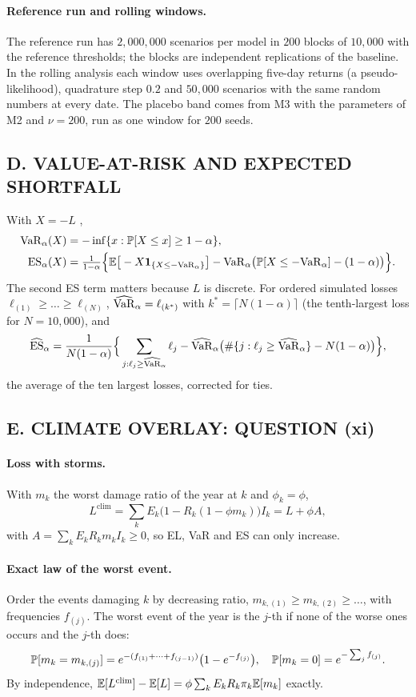 \paragraph{Reference run and rolling windows.} The reference run has $2{,}000{,}000$ scenarios per model in $200$ blocks of $10{,}000$ with the reference thresholds; the blocks are independent replications of the baseline. In the rolling analysis each window uses overlapping five-day returns (a pseudo-likelihood), quadrature step $0.2$ and $50{,}000$ scenarios with the same random numbers at every date. The placebo band comes from M3 with the parameters of M2 and $\nu=200$, run as one window for $200$ seeds.

\subsection*{D. VALUE-AT-RISK AND EXPECTED SHORTFALL}
With $X=-L$ \citep[Ch.~1]{DeGiorgi26},
\begin{align*}
\VaR_\alpha(X)&=-\inf\{x:\P[X\le x]\ge1-\alpha\},\\
\ES_\alpha(X)&=\tfrac{1}{1-\alpha}\Big\{\E\big[-X\ind_{\{X\le-\VaR_\alpha\}}\big]-\VaR_\alpha\big(\P[X\le-\VaR_\alpha]-(1-\alpha)\big)\Big\}.
\end{align*}
The second ES term matters because $L$ is discrete. For ordered simulated losses $\ell_{(1)}\ge\dots\ge\ell_{(N)}$, $\widehat\VaR_\alpha=\ell_{(k^*)}$ with $k^*=\lceil N(1-\alpha)\rceil$ (the tenth-largest loss for $N=10{,}000$), and
\[
\widehat\ES_\alpha=\frac{1}{N(1-\alpha)}\Big\{\sum_{j:\ell_j\ge\widehat\VaR_\alpha}\ell_j-\widehat\VaR_\alpha\big(\#\{j:\ell_j\ge\widehat\VaR_\alpha\}-N(1-\alpha)\big)\Big\},
\]
the average of the ten largest losses, corrected for ties.

\subsection*{E. CLIMATE OVERLAY: QUESTION (xi)}
\paragraph{Loss with storms.} With $m_k$ the worst damage ratio of the year at $k$ and $\phi_k=\phi$,
\[
L^{\mathrm{clim}}=\sum_kE_k\big(1-R_k(1-\phi m_k)\big)I_k=L+\phi A,
\]
with $A=\sum_kE_kR_km_kI_k\ge0$, so EL, VaR and ES can only increase.

\paragraph{Exact law of the worst event.} Order the events damaging $k$ by decreasing ratio, $m_{k,(1)}\ge m_{k,(2)}\ge\dots$, with frequencies $f_{(j)}$. The worst event of the year is the $j$-th if none of the worse ones occurs and the $j$-th does:
\[
\P[m_k=m_{k,(j)}]=e^{-(f_{(1)}+\dots+f_{(j-1)})}\big(1-e^{-f_{(j)}}\big),\quad \P[m_k=0]=e^{-\sum_jf_{(j)}} .
\]
By independence, $\E[L^{\mathrm{clim}}]-\E[L]=\phi\sum_kE_kR_k\pi_k\E[m_k]$ exactly.

